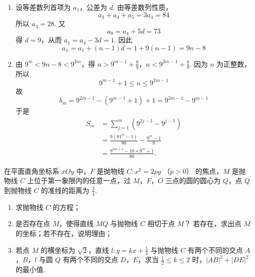 \begin{solution}
\begin{enumerate}
\item
设等差数列首项为 \(a_1\)，公差为 \(d\). 由等差数列性质，
\[
a_3+a_4+a_5=3a_4=84
\]
所以 \(a_4=28\). 又
\[
a_9=a_4+5d=73
\]
得 \(d=9\)，从而 \(a_1=a_4-3d=1\). 因此
\[
a_n=a_1+(n-1)d=1+9(n-1)=9n-8
\]
\item
由 \(9^m<9n-8<9^{2m}\)，得
\(n>9^{m-1}+\frac89\)，\(n<9^{2m-1}+\frac89\).
因为 \(n\) 为正整数，所以
\[
9^{m-1}+1\leqslant n\leqslant9^{2m-1}
\]
故
\[
b_m=9^{2m-1}-\left(9^{m-1}+1\right)+1
=9^{2m-1}-9^{m-1}
\]
于是
\[
\begin{aligned}
S_m
&=\sum_{j=1}^m\left(9^{2j-1}-9^{j-1}\right)\\
&=\frac{9(81^m-1)}{80}-\frac{9^m-1}{8}\\
&=\frac{9^{2m+1}-10\times9^m+1}{80}.
\end{aligned}
\]
\end{enumerate}
\end{solution}

\begin{problem}
在平面直角坐标系 \(xOy\) 中，\(F\) 是抛物线 \(C: x^2 = 2py\) （\(p > 0\)） 的焦点，\(M\) 是抛物线 \(C\) 上位于第一象限内的任意一点，过 \(M\)，\(F\)，\(O\) 三点的圆的圆心为 \(Q\)，点 \(Q\) 到抛物线 \(C\) 的准线的距离为 \(\frac{3}{4}\).
\begin{enumerate}
\item 求抛物线 \(C\) 的方程；
\item 是否存在点 \(M\)，使得直线 \(MQ\) 与抛物线 \(C\) 相切于点 \(M\)？ 若存在，求出点 \(M\) 的坐标；若不存在，说明理由；
\item 若点 \(M\) 的横坐标为 \(\sqrt{2}\)，直线 \(l: y = kx + \frac{1}{4}\) 与抛物线 \(C\) 有两个不同的交点 \(A\)，\(B\)，\(l\) 与圆 \(Q\) 有两个不同的交点 \(D\)，\(E\)，求当 \(\frac{1}{2} \leqslant k \leqslant 2\) 时，\(|AB|^2 + |DE|^2\) 的最小值.
\end{enumerate}
\end{problem}

